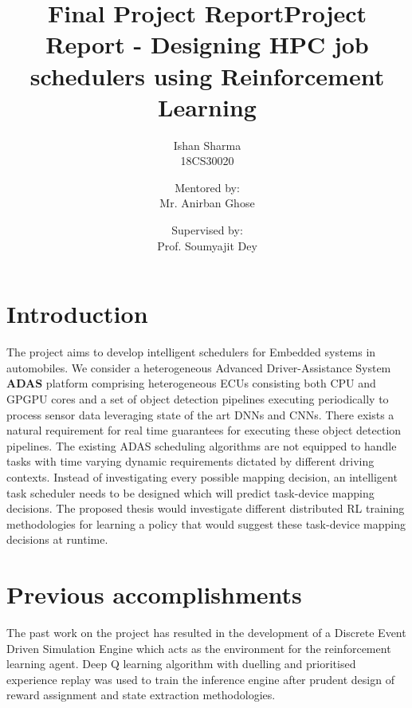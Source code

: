 \documentclass[10pt,a4paper]{article}
\title{Final Project Report}
\begin{document}
\title{\textbf{Project Report - Designing HPC job schedulers using Reinforcement Learning}}
\author{
  Ishan Sharma \\
  18CS30020
  \and
  Mentored by: \\
  Mr. Anirban Ghose
  \and
  Supervised by: \\
  Prof. Soumyajit Dey
}
\date{}
\maketitle

\makeatletter
\newcommand\thefontsize[1]{{#1 The current font size is: \f@size pt\par}}
\makeatother


\section{Introduction}
\begin{normalsize}
The project aims to develop intelligent schedulers for Embedded systems in automobiles. We consider a heterogeneous Advanced Driver-Assistance System 
\textbf{ADAS} platform comprising heterogeneous ECUs consisting both CPU and GPGPU cores and a set of object detection pipelines executing periodically to process sensor data leveraging state of the art DNNs and CNNs. There exists a natural requirement for real time guarantees for executing these object detection pipelines. The existing ADAS scheduling algorithms are not equipped to handle tasks with time varying dynamic requirements dictated by different driving contexts. Instead of investigating every possible mapping decision, an intelligent task scheduler needs to be designed which will predict task-device mapping decisions. The proposed thesis would investigate different distributed RL training methodologies for learning a policy that would suggest these task-device mapping decisions at runtime.
\end{normalsize}

\section{Previous accomplishments}
\begin{normalsize}
The past work on the project has resulted in the development of a Discrete Event Driven Simulation Engine which acts as the environment for the reinforcement learning agent. Deep Q learning algorithm with duelling and prioritised experience replay was used to train the inference engine after prudent design of reward assignment and state extraction methodologies.
\end{normalsize}
\end{document}
